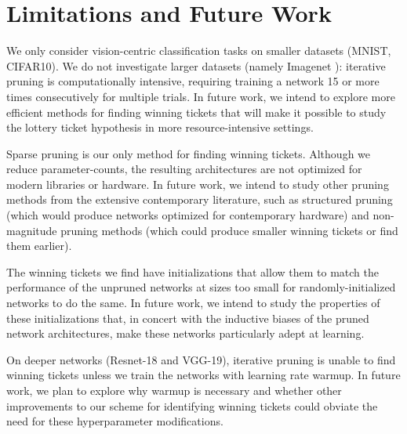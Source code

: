 \section{Limitations and Future Work}

We only consider vision-centric classification tasks on smaller
datasets (MNIST, CIFAR10). We do not investigate larger datasets (namely Imagenet \citep{imagenet}): iterative pruning is computationally intensive, requiring training a network 15 or more times consecutively for multiple trials. In future work, we intend to explore more efficient methods for finding winning tickets that will make it possible to
study the lottery ticket hypothesis in more resource-intensive settings.

Sparse  pruning is our only method for finding winning tickets.
Although we reduce parameter-counts, the resulting architectures are not optimized for modern libraries or hardware. In future work,
we intend to study other pruning methods from the extensive contemporary literature, such as structured pruning (which would produce networks optimized for contemporary hardware) and non-magnitude pruning methods (which could produce smaller winning tickets or
find them earlier).

The winning tickets we find have initializations that allow them to match the performance of the unpruned networks at sizes too small for
randomly-initialized networks to do the same. In future work, we intend to study the properties of these initializations that, in concert with the inductive
biases of the pruned network architectures, make these networks particularly adept at learning.

On deeper networks (Resnet-18 and VGG-19), iterative pruning is unable to find winning tickets unless we train the networks with learning rate warmup. In future work, we plan to explore why warmup is necessary and whether other improvements to our scheme for identifying winning tickets could obviate the need for these hyperparameter modifications.

